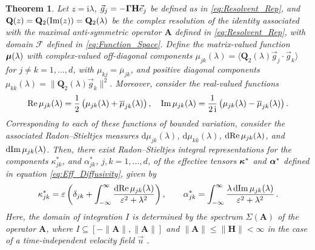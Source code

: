 \documentclass[11pt]{amsart}
\newcommand{\I}{\mathrm{i}}
\renewcommand{\d}{\mathrm{d}}
\newcommand{\Hb}{\mathbf{H}}
\newcommand{\Ab}{\mathbf{A}}
\newcommand{\Qb}{\mathbf{Q}}
\newcommand{\Fs}{\mathscr{F}}
\newcommand\bmu{\mbox{\boldmath${\mu}$}}
\newcommand\balpha{\mbox{\boldmath${\alpha}$}}
\newcommand\bkappa{\mbox{\boldmath${\kappa}$}}
\newcommand\bGamma{\mbox{\boldmath${\Gamma}$}}
\newtheorem{theorem}{Theorem}[section]
\begin{document}
\begin{theorem}\label{thm:Integral_Reps}
Let $z=\I\lambda$, $\vec{g}_j=-\bGamma\Hb\vec{e}_j$ be defined as in
\eqref{eq:Resolvent_Rep}, and $\Qb(z)=\Qb_2({\rm Im}(z))=\Qb_2(\lambda)$ be 
the complex resolution of the identity associated with the maximal
anti-symmetric operator $\Ab$ defined in \eqref{eq:Resolvent_Rep}, with
domain $\Fs$ defined in \eqref{eq:Function_Space}. Define the
matrix-valued function $\bmu(\lambda)$ with complex-valued off-diagonal
components $\mu_{jk}(\lambda)=\langle\Qb_2(\lambda)\vec{g}_j\cdot\vec{g}_k\rangle$ for $j\neq k=1,\ldots,d$,
with $\mu_{kj}=\overline{\mu}_{jk}$, and positive diagonal components
$\mu_{kk}(\lambda)=\|\Qb_2(\lambda)\vec{g}_k\|^2$.  Moreover, consider the real-valued
functions   
%
\begin{align}
  {\rm Re}\,\mu_{jk}(\lambda)
         =\frac{1}{2}\left(\mu_{jk}(\lambda)+\overline{\mu}_{jk}(\lambda)\right), \quad
  {\rm Im}\,\mu_{jk}(\lambda)
         =\frac{1}{2\,\I}\left(\mu_{jk}(\lambda)-\overline{\mu}_{jk}(\lambda)\right).
\end{align}
%
Corresponding to each of these functions of bounded variation, 
consider the associated 
Radon--Stieltjes measures $\d\mu_{jk}(\lambda)$, $\d\mu_{kk}(\lambda)$, $\d{\rm
  Re}\,\mu_{jk}(\lambda)$, and $\d{\rm Im}\,\mu_{jk}(\lambda)$. Then, there exist 
Radon--Stieltjes integral representations for the components
 $\kappa^*_{jk}$, and $\alpha^*_{jk}$, $j,k=1,\ldots,d$,
of the effective tensors
$\bkappa^*$ and $\balpha^*$ defined in equation \eqref{eq:Eff_Diffusivity},
given by         
%
\begin{align}\label{eq:Integral_Rep_kappa*}
  \kappa^*_{jk}=\varepsilon\left(\delta_{jk}+\int_{-\infty}^\infty\frac{\d{\rm Re}\,\mu_{jk}(\lambda)}{\varepsilon^2+\lambda^2}\right),
  \qquad
  \alpha^*_{jk}=\int_{-\infty}^\infty\frac{\lambda\,\d{\rm Im}\,\mu_{jk}(\lambda)}{\varepsilon^2+\lambda^2}\,.       
\end{align}
%
Here, the domain of integration $I$ is determined by the spectrum
$\Sigma(\Ab)$ of the operator $\Ab$, where $I\subseteq[-\|\Ab\|,\|\Ab\|]$ and
$\|\Ab\|\leq\|\Hb\|<\infty$ in the case of a time-independent velocity field
$\vec{u}$ \cite{Reed-1980}.     
%
\end{theorem}
\end{document}
